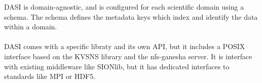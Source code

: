 DASI is domain-agnostic, and is configured for each scientific domain using a schema. The schema
defines the metadata keys which index and identify the data within a domain. 

\paragraph{}
DASI comes with a specific libraty and its own API, but it includes a POSIX interface based on the KVSNS
library and the nfs-ganesha server. It is interface with existing middleware like SIONlib, but it has 
dedicated interfaces to standards like MPI or HDF5. 

